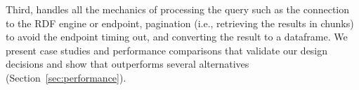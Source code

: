 \item
Third, \rdfframes handles all the mechanics of processing the \sparql query such as the connection to the RDF engine 
or \sparql endpoint, pagination (i.e., retrieving the results in chunks) to avoid the endpoint timing out, and converting the result to a dataframe. 
We present case studies and performance comparisons that validate our design decisions
and
show that \rdfframes outperforms several
alternatives
(Section~\ref{sec:performance}).

\squishend

